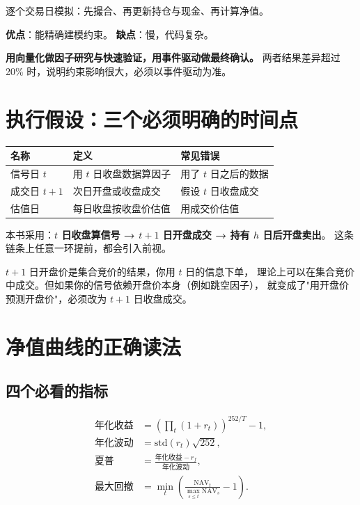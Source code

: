 逐个交易日模拟：先撮合、再更新持仓与现金、再计算净值。

\textbf{优点}：能精确建模约束。
\textbf{缺点}：慢，代码复杂。

\begin{keybox}[本书的做法]
\textbf{用向量化做因子研究与快速验证，用事件驱动做最终确认。}
两者结果差异超过 20\% 时，说明约束影响很大，必须以事件驱动为准。
\end{keybox}

\section{执行假设：三个必须明确的时间点}

\begin{center}
\begin{tabular}{@{}lll@{}}
\toprule
名称 & 定义 & 常见错误 \\
\midrule
信号日 $t$ & 用 $t$ 日收盘数据算因子 & 用了 $t$ 日之后的数据 \\
成交日 $t+1$ & 次日开盘或收盘成交 & 假设 $t$ 日收盘成交 \\
估值日 & 每日收盘按收盘价估值 & 用成交价估值 \\
\bottomrule
\end{tabular}
\end{center}

本书采用：\textbf{$t$ 日收盘算信号 → $t+1$ 日开盘成交 → 持有 $h$ 日后开盘卖出}。
这条链条上任意一环提前，都会引入前视。

\begin{warnbox}[开盘成交也不完全现实]
$t+1$ 日开盘价是集合竞价的结果，你用 $t$ 日的信息下单，
理论上可以在集合竞价中成交。但如果你的信号依赖开盘价本身（例如跳空因子），
就变成了"用开盘价预测开盘价"，必须改为 $t+1$ 日收盘成交。
\end{warnbox}

\section{净值曲线的正确读法}

\subsection{四个必看的指标}

\begin{align}
  \text{年化收益} &= \left(\prod_t (1+r_t)\right)^{252/T} - 1, \\
  \text{年化波动} &= \mathrm{std}(r_t)\sqrt{252}, \\
  \text{夏普} &= \frac{\text{年化收益} - r_f}{\text{年化波动}}, \\
  \text{最大回撤} &= \min_t\left(\frac{\text{NAV}_t}{\max_{s\le t}\text{NAV}_s} - 1\right).
\end{align}

